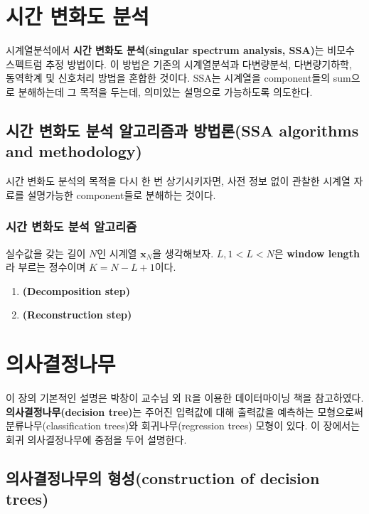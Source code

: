 \documentclass[b5paper,]{scrbook}
\theoremstyle{plain}
\theoremstyle{definition}
\numberwithin{equation}{section}
\begin{document}
\chapter{시간 변화도 분석}\label{SSA}

시계열분석에서 \textbf{시간 변화도 분석(singular spectrum analysis,
SSA)}는 비모수 스펙트럼 추정 방법이다. 이 방법은 기존의 시계열분석과
다변량분석, 다변량기하학, 동역학계 및 신호처리 방법을 혼합한 것이다.
SSA는 시계열을 component들의 sum으로 분해하는데 그 목적을 두는데,
의미있는 설명으로 가능하도록 의도한다.

\section{시간 변화도 분석 알고리즘과 방법론(SSA algorithms and
methodology)}\label{----ssa-algorithms-and-methodology}

시간 변화도 분석의 목적을 다시 한 번 상기시키자면, 사전 정보 없이 관찰한
시계열 자료를 설명가능한 component들로 분해하는 것이다.

\subsection{시간 변화도 분석 알고리즘}\label{---}

실수값을 갖는 길이 \(N\)인 시계열 \(\mathbf{x}_{N}\)을 생각해보자.
\(L, 1<L<N\)은 \textbf{window length}라 부르는 정수이며 \(K=N-L+1\)이다.

\begin{enumerate}
\def\labelenumi{\arabic{enumi}.}
\item
  \textbf{(Decomposition step)}
\item
  \textbf{(Reconstruction step)}
\end{enumerate}

\chapter{의사결정나무}\label{trees}

이 장의 기본적인 설명은 박창이 교수님 외 R을 이용한 데이터마이닝 책을
참고하였다. \textbf{의사결정나무(decision tree)}는 주어진 입력값에 대해
출력값을 예측하는 모형으로써 분류나무(classification trees)와
회귀나무(regression trees) 모형이 있다. 이 장에서는 회귀 의사결정나무에
중점을 두어 설명한다.

\section{의사결정나무의 형성(construction of decision
trees)}\label{-construction-of-decision-trees}
\end{document}
